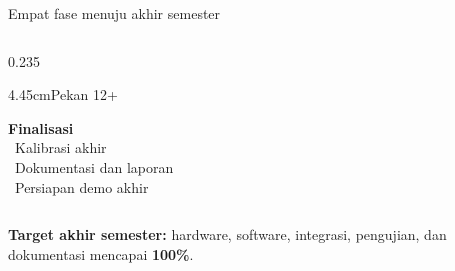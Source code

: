 \documentclass[aspectratio=169,10pt,t]{beamer}
\newcommand{\hl}[1]{{\setlength{\fboxsep}{1.2pt}\colorbox{ryel}{\bfseries\color{rblue}#1}}}
\begin{document}
\begin{frame}{Empat fase menuju akhir semester}
\begin{columns}[T]
\begin{column}{0.235\textwidth}
\begin{phase}{4.45cm}{Pekan 12+}
                    \small\raggedright\textbf{Finalisasi}\\[3pt]
                    \textbullet~Kalibrasi akhir\\\textbullet~Dokumentasi dan laporan\\\textbullet~Persiapan demo akhir
                \end{phase}
            \end{column}
        \end{columns}
        \par\vspace{6pt}\begin{dpanel}\small\textbf{\color{rblue}Target akhir semester:} hardware, software, integrasi, pengujian, dan dokumentasi mencapai \hl{100\%}.\end{dpanel}
    \end{frame}
\end{document}
